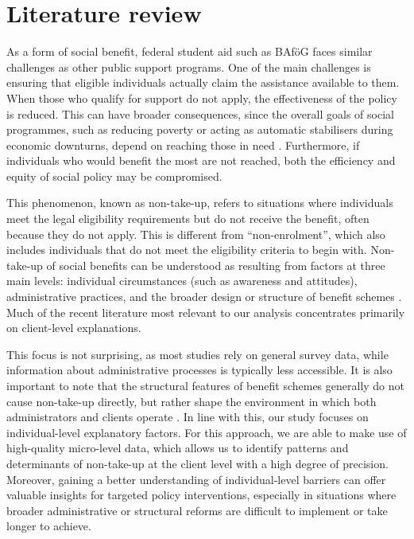 \section{Literature review}
\label{section:literature_review}

As a form of social benefit, federal student aid such as BAföG faces similar challenges as other public support programs. One of the main challenges is ensuring that eligible individuals actually claim the assistance available to them. When those who qualify for support do not apply, the effectiveness of the policy is reduced. This can have broader consequences, since the overall goals of social programmes, such as reducing poverty or acting as automatic stabilisers during economic downturns, depend on reaching those in need \citep{goedeme_concept_2020}. Furthermore, if individuals who would benefit the most are not reached, both the efficiency and equity of social policy may be compromised.

This phenomenon, known as non-take-up, refers to situations where individuals meet the legal eligibility requirements but do not receive the benefit, often because they do not apply.
This is different from “non-enrolment”, which also includes individuals that do not meet the eligibility criteria to begin with. Non-take-up of social benefits can be understood as resulting from factors at three main levels: individual circumstances (such as awareness and attitudes), administrative practices, and the broader design or structure of benefit schemes \citep{vanoorschot_failing_2002}. Much of the recent literature most relevant to our analysis concentrates primarily on client-level explanations. 

This focus is not surprising, as most studies rely on general survey data, while information about administrative processes is typically less accessible. It is also important to note that the structural features of benefit schemes generally do not cause non-take-up directly, but rather shape the environment in which both administrators and clients operate \citep{vanoorschot_failing_2002}. In line with this, our study focuses on individual-level explanatory factors. For this approach, we are able to make use of high-quality micro-level data, which allows us to identify patterns and determinants of non-take-up at the client level with a high degree of precision. Moreover, gaining a better understanding of individual-level barriers can offer valuable insights for targeted policy interventions, especially in situations where broader administrative or structural reforms are difficult to implement or take longer to achieve.

